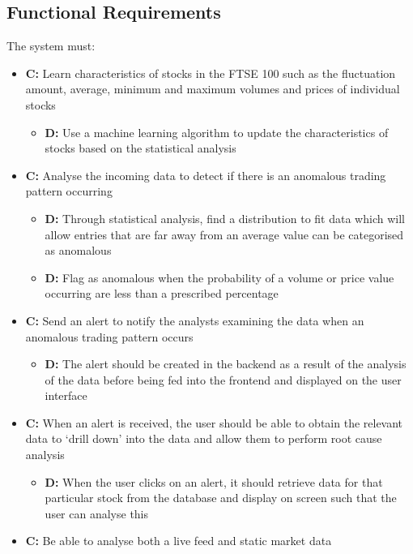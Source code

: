 \documentclass[11pt, oneside, a4paper]{article}
\begin{document}
\subsection{Functional Requirements}
The system must:
\begin{itemize}
	\item \textbf{C:} Learn characteristics of stocks in the FTSE 100 such as the fluctuation amount, average, minimum and maximum volumes and prices of individual stocks
	\begin{itemize}
		\item \textbf{D:} Use a machine learning algorithm to update the characteristics of stocks based on the statistical analysis
	\end{itemize}
	\item \textbf{C:} Analyse the incoming data to detect if there is an anomalous trading pattern occurring
	\begin{itemize}
		\item \textbf{D:} Through statistical analysis, find a distribution to fit data which will allow entries that are far away from an average value can be categorised as anomalous
		\item \textbf{D:} Flag as anomalous when the probability of a volume or price value occurring are less than a prescribed percentage
	\end{itemize}
	\item \textbf{C:} Send an alert to notify the analysts examining the data when an anomalous trading pattern occurs
	\begin{itemize}
		\item \textbf{D:} The alert should be created in the backend as a result of the analysis of the data before being fed into the frontend and displayed on the user interface
	\end{itemize}
	\item \textbf{C:} When an alert is received, the user should be able to obtain the relevant data to ‘drill down’ into the data and allow them to perform root cause analysis
	\begin{itemize}
		\item \textbf{D:} When the user clicks on an alert, it should retrieve data for that particular stock from the database and display on screen such that the user can analyse this
	\end{itemize}
	\item \textbf{C:} Be able to analyse both a live feed and static market data
	\begin{itemize}

\end{itemize}
\end{itemize}
\end{document}
